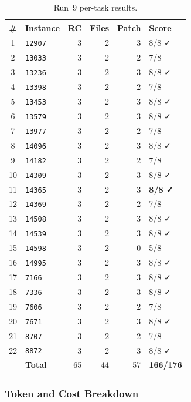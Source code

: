 \begin{table}[h]
\centering
\small
\caption{Run~9 per-task results.}\label{tab:r9-tasks}
\setlength{\tabcolsep}{4pt}
\begin{tabular}{clrrrl}
\toprule
\textbf{\#} & \textbf{Instance} & \textbf{RC} & \textbf{Files} & \textbf{Patch} & \textbf{Score} \\
\midrule
 1 & \texttt{12907} & 3 & 2 & 3 & 8/8 ✓ \\
 2 & \texttt{13033} & 3 & 2 & 2 & 7/8 \\
 3 & \texttt{13236} & 3 & 2 & 3 & 8/8 ✓ \\
 4 & \texttt{13398} & 3 & 2 & 2 & 7/8 \\
 5 & \texttt{13453} & 3 & 2 & 3 & 8/8 ✓ \\
 6 & \texttt{13579} & 3 & 2 & 3 & 8/8 ✓ \\
 7 & \texttt{13977} & 3 & 2 & 2 & 7/8 \\
 8 & \texttt{14096} & 3 & 2 & 3 & 8/8 ✓ \\
 9 & \texttt{14182} & 3 & 2 & 2 & 7/8 \\
10 & \texttt{14309} & 3 & 2 & 3 & 8/8 ✓ \\
11 & \texttt{14365} & 3 & 2 & 3 & \textbf{8/8 ✓} \\
12 & \texttt{14369} & 3 & 2 & 2 & 7/8 \\
13 & \texttt{14508} & 3 & 2 & 3 & 8/8 ✓ \\
14 & \texttt{14539} & 3 & 2 & 3 & 8/8 ✓ \\
15 & \texttt{14598} & 3 & 2 & 0 & 5/8 \\
16 & \texttt{14995} & 3 & 2 & 3 & 8/8 ✓ \\
17 & \texttt{7166}  & 3 & 2 & 3 & 8/8 ✓ \\
18 & \texttt{7336}  & 3 & 2 & 3 & 8/8 ✓ \\
19 & \texttt{7606}  & 3 & 2 & 2 & 7/8 \\
20 & \texttt{7671}  & 3 & 2 & 3 & 8/8 ✓ \\
21 & \texttt{8707}  & 3 & 2 & 2 & 7/8 \\
22 & \texttt{8872}  & 3 & 2 & 3 & 8/8 ✓ \\
\midrule
   & \textbf{Total} & 65 & 44 & 57 & \textbf{166/176} \\
\bottomrule
\end{tabular}
\end{table}

\subsubsection{Token and Cost Breakdown}

